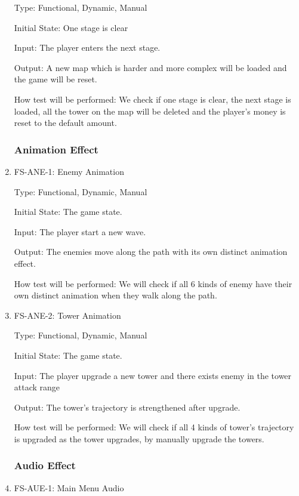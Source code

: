 \documentclass[12pt]{article}
\begin{document}
\begin{enumerate}
	Type: Functional, Dynamic, Manual
	
	Initial State: One stage is clear
	
	Input: The player enters the next stage.
	
	Output: A new map which is harder and more complex will be loaded and the game will be reset.
	
	How test will be performed: We check if one stage is clear, the next stage is loaded, all the tower on the map will be deleted and the player's money is reset to the default amount.

    
    
	\subsubsection{Animation Effect}
					
					
    \color{red}
    \item{FS-ANE-1: Enemy Animation}
    \color{black}
    
    Type: Functional, Dynamic, Manual
    
    Initial State: The game state.
    
    Input: The player start a new wave.
    
    Output: The enemies move along the path with its own distinct animation effect.
    
    How test will be performed: We will check if all 6 kinds of enemy have their own distinct animation when they walk along the path.
    \color{red}
    \item{FS-ANE-2: Tower Animation}
    
    
    Type: Functional, Dynamic, Manual
    
    Initial State: The game state.
    
    Input: The player upgrade a new tower and there exists enemy in the tower attack range
    
    Output: The tower's trajectory is strengthened after upgrade.
    
    How test will be performed: We will check if all 4 kinds of tower's trajectory is upgraded as the tower upgrades, by manually upgrade the towers.
    \color{black}
    
	\subsubsection{Audio Effect}
	
					
	\item{FS-AUE-1: Main Menu Audio}
					

\end{enumerate}
\end{document}
